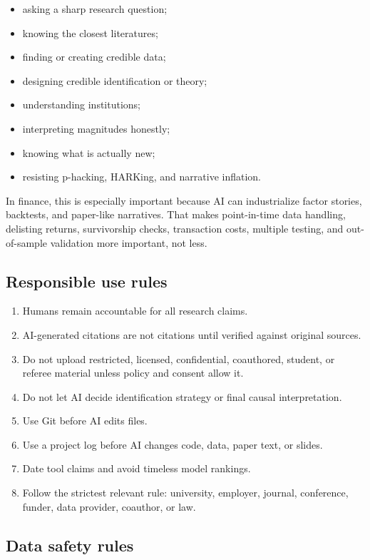 \documentclass[11pt]{article}
\begin{document}
\begin{itemize}[leftmargin=2em]
  \item asking a sharp research question;
  \item knowing the closest literatures;
  \item finding or creating credible data;
  \item designing credible identification or theory;
  \item understanding institutions;
  \item interpreting magnitudes honestly;
  \item knowing what is actually new;
  \item resisting p-hacking, HARKing, and narrative inflation.
\end{itemize}

In finance, this is especially important because AI can industrialize factor stories, backtests, and paper-like narratives. That makes point-in-time data handling, delisting returns, survivorship checks, transaction costs, multiple testing, and out-of-sample validation more important, not less.

\subsection{Responsible use rules}

\begin{enumerate}[leftmargin=2em]
  \item Humans remain accountable for all research claims.
  \item AI-generated citations are not citations until verified against original sources.
  \item Do not upload restricted, licensed, confidential, coauthored, student, or referee material unless policy and consent allow it.
  \item Do not let AI decide identification strategy or final causal interpretation.
  \item Use Git before AI edits files.
  \item Use a project log before AI changes code, data, paper text, or slides.
  \item Date tool claims and avoid timeless model rankings.
  \item Follow the strictest relevant rule: university, employer, journal, conference, funder, data provider, coauthor, or law.
\end{enumerate}

\subsection{Data safety rules}
\end{document}
